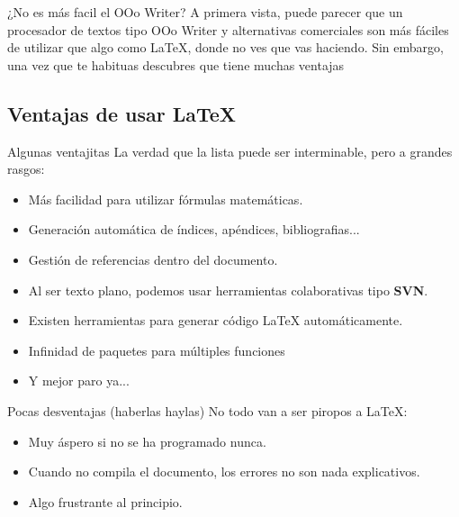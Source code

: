 \documentclass[9pt,xcolor=svgnames]{beamer}
\begin{document}
 \begin{frame}
   \begin{block}{¿No es más facil el OOo Writer?}
     \noindent A primera vista, puede parecer que un procesador de
     textos tipo OOo Writer y alternativas comerciales son más fáciles
     de utilizar que algo como \LaTeX{}, donde no ves que vas
     haciendo. Sin embargo, una vez que te habituas descubres que tiene
     muchas ventajas
   \end{block}
 \end{frame}

 \subsection{Ventajas de usar \LaTeX}

 \begin{frame}
   \begin{block}{Algunas ventajitas}
   \noindent La verdad que la lista puede ser interminable, pero a
   grandes rasgos:
   \begin{itemize}
   \item Más facilidad para utilizar fórmulas matemáticas.
   \item Generación automática de índices, apéndices, bibliografias...
   \item Gestión de referencias dentro del documento.
   \item Al ser texto plano, podemos usar herramientas colaborativas
     tipo \textbf{SVN}.
   \item Existen herramientas para generar código \LaTeX{} automáticamente.
   \item Infinidad de paquetes para múltiples funciones
   \item Y mejor paro ya...
   \end{itemize}
 \end{block}

 \pause

 \begin{block}{Pocas desventajas (haberlas haylas)}
   \noindent No todo van a ser piropos a \LaTeX:
   \begin{itemize}
   \item Muy áspero si no se ha programado nunca.
   \item Cuando no compila el documento, los errores no son nada explicativos.
   \item Algo frustrante al principio.
   \end{itemize}
 \end{block}

\end{frame}
\end{document}
